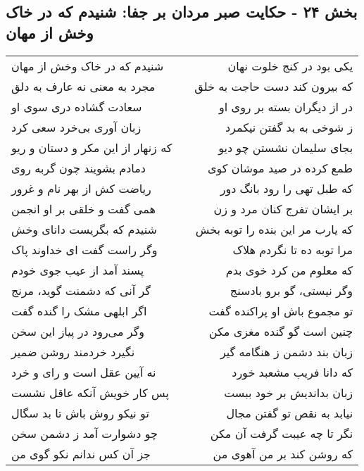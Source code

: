 \begin{center}
\section*{بخش ۲۴ - حکایت صبر مردان بر جفا: شنیدم که در خاک وخش از مهان}
\label{sec:024}
\begin{longtable}{l p{0.5cm} r}
شنیدم که در خاک وخش از مهان
&&
یکی بود در کنج خلوت نهان
\\
مجرد به معنی نه عارف به دلق
&&
که بیرون کند دست حاجت به خلق
\\
سعادت گشاده دری سوی او
&&
در از دیگران بسته بر روی او
\\
زبان آوری بی‌خرد سعی کرد
&&
ز شوخی به بد گفتن نیکمرد
\\
که زنهار از این مکر و دستان و ریو
&&
بجای سلیمان نشستن چو دیو
\\
دمادم بشویند چون گربه روی
&&
طمع کرده در صید موشان کوی
\\
ریاضت کش از بهر نام و غرور
&&
که طبل تهی را رود بانگ دور
\\
همی گفت و خلقی بر او انجمن
&&
بر ایشان تفرج کنان مرد و زن
\\
شنیدم که بگریست دانای وخش
&&
که یارب مر این بنده را توبه بخش
\\
وگر راست گفت ای خداوند پاک
&&
مرا توبه ده تا نگردم هلاک
\\
پسند آمد از عیب جوی خودم
&&
که معلوم من کرد خوی بدم
\\
گر آنی که دشمنت گوید، مرنج
&&
وگر نیستی، گو برو بادسنج
\\
اگر ابلهی مشک را گنده گفت
&&
تو مجموع باش او پراکنده گفت
\\
وگر می‌رود در پیاز این سخن
&&
چنین است گو گنده مغزی مکن
\\
نگیرد خردمند روشن ضمیر
&&
زبان بند دشمن ز هنگامه گیر
\\
نه آیین عقل است و رای و خرد
&&
که دانا فریب مشعبد خورد
\\
پس کار خویش آنکه عاقل نشست
&&
زبان بداندیش بر خود ببست
\\
تو نیکو روش باش تا بد سگال
&&
نیابد به نقص تو گفتن مجال
\\
چو دشوارت آمد ز دشمن سخن
&&
نگر تا چه عیبت گرفت آن مکن
\\
جز آن کس ندانم نکو گوی من
&&
که روشن کند بر من آهوی من
\\
\end{longtable}
\end{center}

